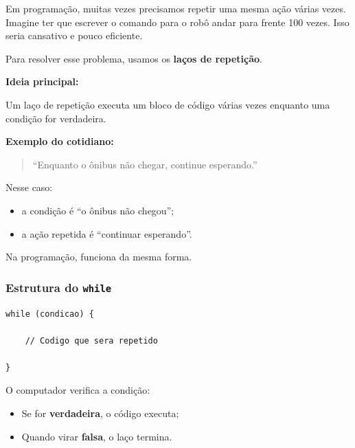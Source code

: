 \documentclass[conference]{IEEEtran}
\begin{document}
Em programação, muitas vezes precisamos repetir uma mesma ação várias vezes.  
Imagine ter que escrever o comando para o robô andar para frente 100 vezes. Isso seria cansativo e pouco eficiente.

Para resolver esse problema, usamos os \textbf{laços de repetição}.

\vspace{0.2cm}

\textbf{Ideia principal:}

Um laço de repetição executa um bloco de código várias vezes enquanto uma condição for verdadeira.

\vspace{0.3cm}

\textbf{Exemplo do cotidiano:}

\begin{quote}
“Enquanto o ônibus não chegar, continue esperando.”
\end{quote}

Nesse caso:
\begin{itemize}
    \item a condição é “o ônibus não chegou”;
    \item a ação repetida é “continuar esperando”.
\end{itemize}

Na programação, funciona da mesma forma.

\vspace{0.3cm}

\subsubsection{Estrutura do \texttt{while}}

\begin{lstlisting}[caption={Estrutura basica do while}]
while (condicao) {

    // Codigo que sera repetido

}
\end{lstlisting}

\vspace{0.2cm}

O computador verifica a condição:
\begin{itemize}
    \item Se for \textbf{verdadeira}, o código executa;
    \item Quando virar \textbf{falsa}, o laço termina.
\end{itemize}

\vspace{0.3cm}
\end{document}

